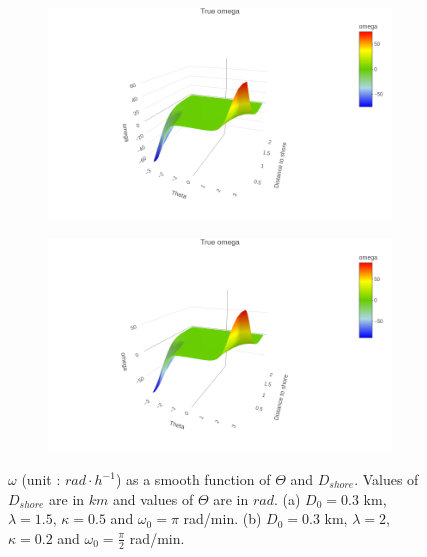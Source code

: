 \documentclass[11pt]{article}
\newcommand {\1}{\mathbb{1}}
\begin{document}
 
 \begin{figure}[H]
 	\centering
 	\begin{subfigure}{0.48\textwidth}
 		\centering
 		\includegraphics[scale=0.3]{images/simulation study/true_omega_rect.png}
 		\caption{}
 	\end{subfigure}
 	\begin{subfigure}{0.48\textwidth}
 		\centering
 		\includegraphics[scale=0.3]{images/simulation study/true_omega_fjords.png}
 		\caption{}
 	\end{subfigure}
 	\caption{$\omega$ (unit : $rad \cdot h^{-1}$) as a smooth function of $\Theta$ and $D_{shore}$. Values of $D_{shore}$ are in $km$ and values of $\Theta$ are in $rad$.
 		(a) $D_0=0.3$ km, $\lambda=1.5$, $\kappa=0.5$ and $\omega_0=\pi$ rad/min. 
 		(b)  $D_0=0.3$ km, $\lambda=2$, $\kappa=0.2$ and $\omega_0=\frac{\pi}{2}$ rad/min.}
 	\label{fig: trueomega}
 \end{figure}
 
 
 
\end{document}
